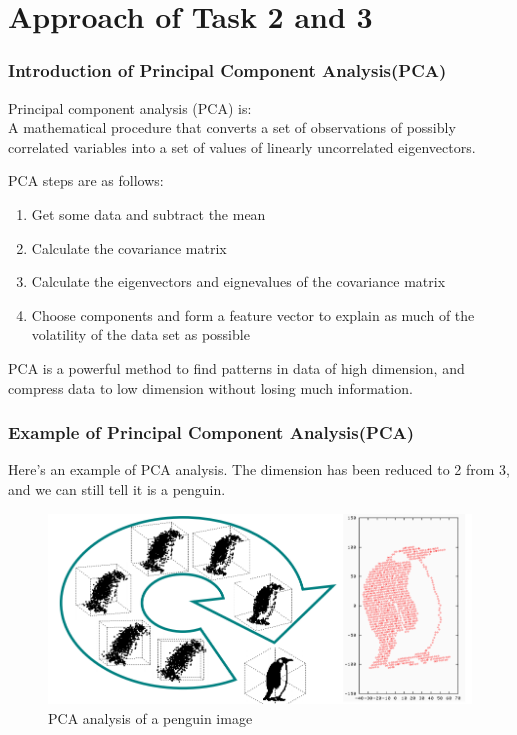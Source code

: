 \documentclass[compress,handout,10pt]{beamer}
\let\olditem\item
\renewcommand{\item}{\setlength{\itemsep}{0.5\baselineskip}\olditem}
\begin{document}
\section{Approach of Task 2 and 3}
\begin{frame}
    \frametitle{Introduction of Principal Component Analysis(PCA)}
Principal component analysis (PCA) is:\\
A mathematical procedure that converts a set of observations of possibly correlated variables into a set of values of linearly uncorrelated eigenvectors. 

PCA steps are as follows:
	\begin{enumerate}
	\item Get some data and subtract the mean
	\item Calculate the covariance matrix 
	\item Calculate the eigenvectors and eignevalues of the covariance matrix
	\item Choose components and form a feature vector to explain as much of the volatility of the data set as possible
	\end{enumerate}

\color{red} PCA is a powerful method to find patterns in data of high dimension, and compress data to low dimension without losing much information.
\end{frame}

\begin{frame}
    \frametitle{Example of Principal Component Analysis(PCA)}
Here's an example of PCA analysis. 
The dimension has been reduced to 2 from 3, and we can still tell it is a penguin.
\begin{figure}[h]
\begin{center}
\includegraphics[width=\textwidth]{images/8.png}
\end{center}
\caption{PCA analysis of a penguin image}
\label{fig:penguin}
\end{figure}
\end{frame}
\end{document}
